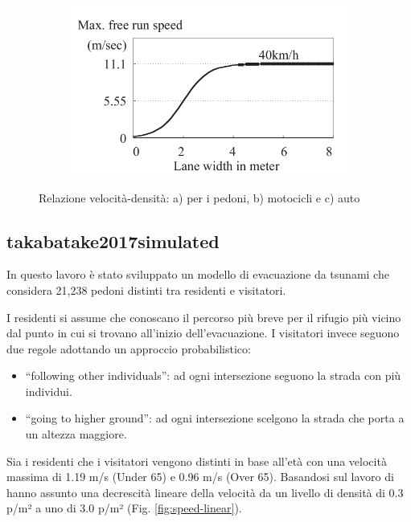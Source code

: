 \begin{figure}[ht]
\begin{subfigure}{0.45\textwidth}
        \includegraphics[width=\textwidth]{images/speed_GOTO_auto.png}
        \caption{}
        \label{fig:wrsnjds}
    \end{subfigure}
    \caption{Relazione velocità-densità: a) per i pedoni, b) motocicli e c) auto}
    \label{fig:ankdasndk}
\end{figure}


\subsection{takabatake2017simulated}
In questo lavoro è stato sviluppato un modello di evacuazione da tsunami che considera
21,238 pedoni distinti tra residenti e visitatori.

I residenti si assume che conoscano il percorso più breve
per il rifugio più vicino dal punto in cui si trovano all'inizio dell'evacuazione.
%
I visitatori invece seguono due regole adottando un approccio probabilistico:
\begin{itemize}
    \item “following other individuals”: ad ogni intersezione seguono la strada con più individui.
    \item “going to higher ground”: ad ogni intersezione scelgono la strada che porta a un altezza maggiore.
\end{itemize}

Sia i residenti che i visitatori vengono distinti in base all'età con una velocità massima di 1.19 m/s (Under 65) e 0.96 m/s (Over 65).
Basandosi sul lavoro di \textcite{older1968movement} hanno assunto una decrescità lineare della 
velocità da un livello di densità di 0.3 p/m² a uno di 3.0 p/m² (Fig. \ref{fig:speed-linear}).

